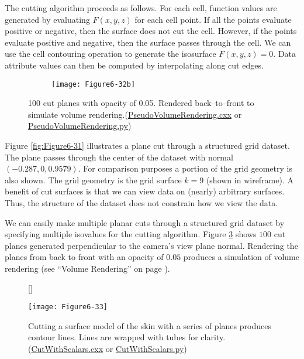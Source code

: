 The cutting algorithm proceeds as follows. For each cell, function values are generated by evaluating $F(x,y,z)$ for each cell point. If all the points evaluate positive or negative, then the surface does not cut the cell. However, if the points evaluate positive and negative, then the surface passes through the cell. We can use the cell contouring operation to generate the isosurface $F(x,y,z) = 0$. Data attribute values can then be computed by interpolating along cut edges.

\begin{figure}[htb]
	\begin{subfigure}[h]{0.48\linewidth}
		\caption{}
		\label{fig:Figure6-32a}
	\end{subfigure}
	\hfill
	\begin{subfigure}[h]{0.48\linewidth}
		\texttt{[image: Figure6-32b]}
		\caption{}
		\label{fig:Figure6-32b}
	\end{subfigure}
	\caption{100 cut planes with opacity of 0.05. Rendered back--to--front to simulate	volume rendering.(\href{https://lorensen.github.io/VTKExamples/site/Cxx/VolumeRendering/PseudoVolumeRendering}{PseudoVolumeRendering.cxx} or \href{https://lorensen.github.io/VTKExamples/site/Python/VolumeRendering/PseudoVolumeRendering/}{PseudoVolumeRendering.py})}\label{fig:Figure6-32}
\end{figure}

Figure \ref{fig:Figure6-31} illustrates a plane cut through a structured grid dataset. The plane passes through the center of the dataset with normal $(-0.287, 0, 0.9579)$. For comparison purposes a portion of the grid geometry is also shown. The grid geometry is the grid surface $k=9$ (shown in wireframe). A benefit of cut surfaces is that we can view data on (nearly) arbitrary surfaces. Thus, the structure of the dataset does not constrain how we view the data.

We can easily make multiple planar cuts through a structured grid dataset by specifying multiple isovalues for the cutting algorithm. Figure \ref{fig:Figure6-32} shows $100$ cut planes generated perpendicular to the camera's view plane normal. Rendering the planes from back to front with an opacity of $0.05$ produces a simulation of volume rendering (see ``Volume Rendering'' on page \pageref{sec:volume_rendering} ).

\begin{figure}[!htb]
	[\FBwidth]
	{\caption{Cutting a surface model of the skin with a series of planes produces contour lines. Lines are wrapped with tubes for clarity. (\href{https://lorensen.github.io/VTKExamples/site/Cxx/VisualizationAlgorithms/CutWithScalars/}{CutWithScalars.cxx} or \href{https://lorensen.github.io/VTKExamples/site/Python/VisualizationAlgorithms/CutWithScalars/}{CutWithScalars.py})}\label{fig:Figure6-33}}
	{\texttt{[image: Figure6-33]}}
\end{figure}

